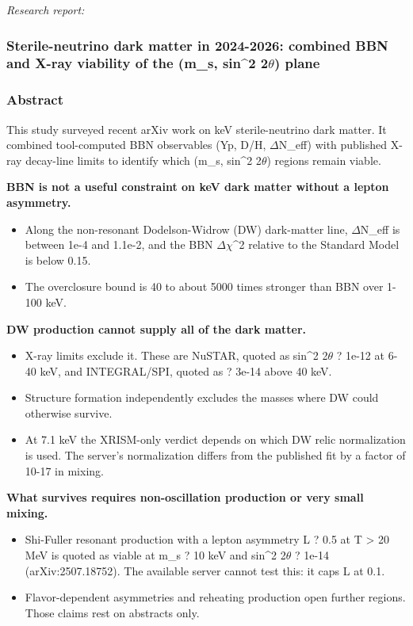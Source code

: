\documentclass[11pt,a4paper]{article}
\begin{document}
\textit{Research report:}\par
\subsubsection*{Sterile-neutrino dark matter in 2024-2026: combined BBN and X-ray viability of the (m\_s, sin\textasciicircum{}2 2$\theta$) plane}
\subsubsection*{Abstract}
This study surveyed recent arXiv work on keV sterile-neutrino dark matter. It combined tool-computed BBN observables (Yp, D/H, $\Delta$N\_eff) with published X-ray decay-line limits to identify which (m\_s, sin\textasciicircum{}2 2$\theta$) regions remain viable.

\textbf{BBN is not a useful constraint on keV dark matter without a lepton asymmetry.}

\begin{itemize}
  \item Along the non-resonant Dodelson-Widrow (DW) dark-matter line, $\Delta$N\_eff is between 1e-4 and 1.1e-2, and the BBN $\Delta$$\chi$\textasciicircum{}2 relative to the Standard Model is below 0.15.
  \item The overclosure bound is 40 to about 5000 times stronger than BBN over 1-100 keV.
\end{itemize}
\textbf{DW production cannot supply all of the dark matter.}

\begin{itemize}
  \item X-ray limits exclude it. These are NuSTAR, quoted as sin\textasciicircum{}2 2$\theta$ ? 1e-12 at 6-40 keV, and INTEGRAL/SPI, quoted as ? 3e-14 above 40 keV.
  \item Structure formation independently excludes the masses where DW could otherwise survive.
  \item At 7.1 keV the XRISM-only verdict depends on which DW relic normalization is used. The server's normalization differs from the published fit by a factor of 10-17 in mixing.
\end{itemize}
\textbf{What survives requires non-oscillation production or very small mixing.}

\begin{itemize}
  \item Shi-Fuller resonant production with a lepton asymmetry L ? 0.5 at T \textgreater{} 20 MeV is quoted as viable at m\_s ? 10 keV and sin\textasciicircum{}2 2$\theta$ ? 1e-14 (arXiv:2507.18752). The available server cannot test this: it caps L at 0.1.
  \item Flavor-dependent asymmetries and reheating production open further regions. Those claims rest on abstracts only.
\end{itemize}
\end{document}

